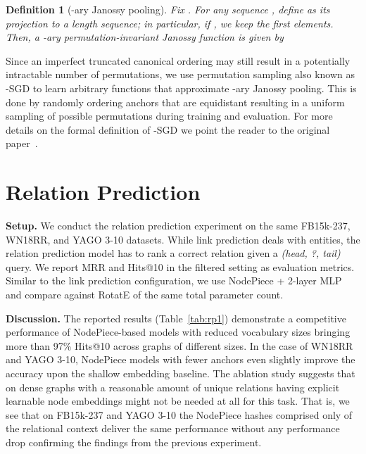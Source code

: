 \documentclass{article} \usepackage{iclr2022_conference,times}
\newtheorem{definition}{Definition}
\begin{document}
\begin{definition}[-ary Janossy pooling] \label{def:GeneralPool}Fix .  
For any sequence , define  as its projection to a length 
 sequence; in particular, if , we keep the first  elements. 
Then, a -ary permutation-invariant Janossy function  is given by 

\end{definition}



Since an imperfect truncated canonical ordering may still result in a potentially intractable number of permutations, we use permutation sampling also known as -SGD to learn arbitrary functions that approximate -ary Janossy pooling. This is done by randomly ordering anchors that are equidistant resulting in a uniform sampling of possible permutations during training and evaluation. For more details on the formal definition of -SGD we point the reader to the original paper~\citep{murphy2019janossy}.

\section{Relation Prediction}
\label{app:rp}

\textbf{Setup.} 
We conduct the relation prediction experiment on the same FB15k-237, WN18RR, and YAGO 3-10 datasets. 
While link prediction deals with entities, the relation prediction model has to rank a correct relation given a \emph{(head, ?, tail)} query. 
We report MRR and Hits@10 in the filtered setting as evaluation metrics.
Similar to the link prediction configuration, we use NodePiece + 2-layer MLP and compare against RotatE of the same total parameter count. 

\textbf{Discussion.} 
The reported results (Table~\ref{tab:rp1}) demonstrate a competitive performance of NodePiece-based models with reduced vocabulary sizes bringing more than 97\% Hits@10 across graphs of different sizes. 
In the case of WN18RR and YAGO 3-10, NodePiece models with fewer anchors even slightly improve the accuracy upon the shallow embedding baseline.
The ablation study suggests that on dense graphs with a reasonable amount of unique relations having explicit learnable node embeddings might not be needed at all for this task.
That is, we see that on FB15k-237 and YAGO 3-10 the NodePiece hashes comprised only of the relational context deliver the same performance without any performance drop confirming the findings from the previous experiment. 
\end{document}
